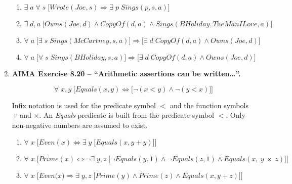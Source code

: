 \begin{enumerate}
\begin{enumerate}
\item
$\exists \; a \; \forall \; s \; \big [\textit{Wrote}(\textit{Joe}, s) \Rightarrow \exists \; p \; \textit{Sings}(p, s, a) \big]$

\item
$\exists \; d, a \; \big[ \textit{Owns}(\textit{Joe}, d) \land \textit{CopyOf}(d, a) \land \textit{Sings}(\textit{BHoliday}, \textit{TheManILove}, a) \big]$

\item
$\forall \; a \; \big[ \exists \; s \; \textit{Sings}(\textit{McCartney}, s, a) \big] \Rightarrow \big[ \exists \; d \; \textit{CopyOf}(d, a) \land \textit{Owns}(\textit{Joe}, d) \big]$

\item
$\forall \; a \; \big[ \forall \; s \; \textit{Sings}(\textit{BHoliday}, s, a) \big] \Rightarrow \big[ \exists \; d \; \textit{CopyOf}(d, a) \land \textit{Owns}(\textit{Joe}, d) \big]$

\end{enumerate}

\item \textbf{AIMA Exercise 8.20 -- ``Arithmetic assertions can be written\ldots''.}

\begin{displaymath}
\forall \; x, y \; \Big[ \textit{Equals}(x, y) \Leftrightarrow \big[ \neg (x < y) \land \neg (y < x) \big] \Big]
\end{displaymath}

Infix notation is used for the predicate symbol $<$ and the function symbols $+$ and $\times$. An \textit{Equals} predicate is built from the predicate symbol $<$. Only non-negative numbers are assumed to exist. 

\begin{enumerate}

\item 
$\forall \; x \; \Big[ \textit{Even}(x) \Leftrightarrow \exists \; y \; \big[ \textit{Equals}(x, y + y) \big] \Big]$

\item
$\forall \; x \; \Big[ \textit{Prime}(x) \Leftrightarrow \neg \exists \; y, z \; \big[ \neg \textit{Equals}(y, 1) \land \neg \textit{Equals}(z, 1) \land \textit{Equals}(x,~y~\times~z) \big] \Big]$

\item
$\forall \; x \; \Big[ \textit{Even(x)} \Rightarrow \exists \; y, z \; \big[ \textit{Prime}(y) \land \textit{Prime}(z) \land \textit{Equals}(x, y + z) \big] \Big]$


\end{enumerate}
\end{enumerate}
